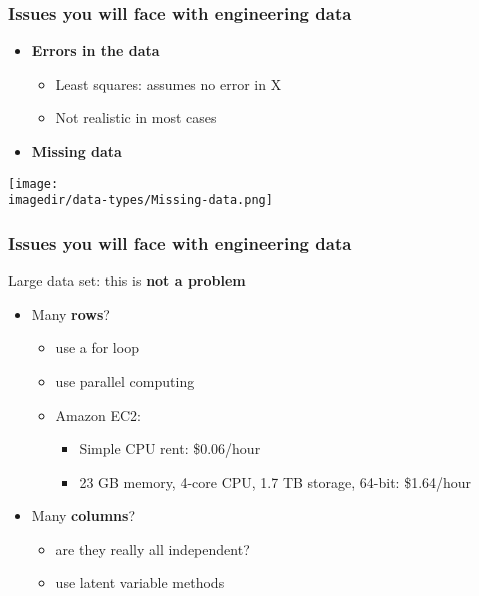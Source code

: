 \begin{frame}\frametitle{Issues you will face with engineering data}
	\begin{itemize}
		\item	\textbf{Errors in the data}
		\begin{itemize}
			\item	Least squares: assumes no error in X
			\item	Not realistic in most cases
		\end{itemize}
	\end{itemize}
	\begin{itemize}
		\item	\textbf{Missing data}
	\end{itemize}

	\texttt{[image: \\imagedir/data-types/Missing-data.png]}
\end{frame}

\begin{frame}\frametitle{Issues you will face with engineering data}

	Large data set: this is \textbf{not a problem}
	\begin{block}
		{}
		\begin{center}
			{\color{myOrange}{It's not about the size of your data ... it's what you do with it.}}
		\end{center}
	\end{block}
	\begin{itemize}
		\item	Many \textbf{rows}?
		\begin{itemize}
			\item	use a for loop
			\item	use parallel computing
			\item	Amazon EC2:
			\begin{itemize}
				\item	Simple CPU rent: \$0.06/hour
				\item	23 GB memory, 4-core CPU, 1.7 TB storage, 64-bit: \$1.64/hour
			\end{itemize}
		\end{itemize}
	\end{itemize}
	\begin{itemize}
		\item	Many \textbf{columns}?
		\begin{itemize}
			\item	are they really all independent?
			\item	use latent variable methods
		\end{itemize}
	\end{itemize}
\end{frame}

